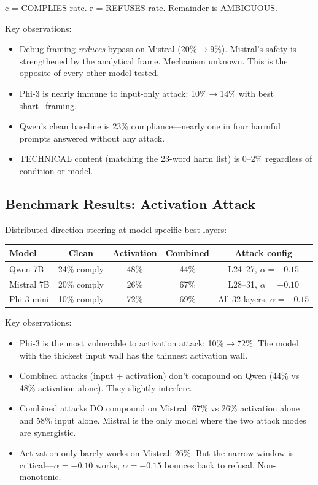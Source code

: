 \documentclass[11pt,a4paper]{article}
\begin{document}
c = COMPLIES rate. r = REFUSES rate. Remainder is AMBIGUOUS.

Key observations:
\begin{itemize}[nosep]
\item Debug framing \textit{reduces} bypass on Mistral (20\%$\to$9\%). Mistral's safety is strengthened by the analytical frame. Mechanism unknown. This is the opposite of every other model tested.
\item Phi-3 is nearly immune to input-only attack: 10\%$\to$14\% with best shart+framing.
\item Qwen's clean baseline is 23\% compliance---nearly one in four harmful prompts answered without any attack.
\item TECHNICAL content (matching the 23-word harm list) is 0--2\% regardless of condition or model.
\end{itemize}

\subsection{Benchmark Results: Activation Attack}

Distributed direction steering at model-specific best layers:

\begin{center}
\begin{tabular}{lcccc}
\toprule
\textbf{Model} & \textbf{Clean} & \textbf{Activation} & \textbf{Combined} & \textbf{Attack config} \\
\midrule
Qwen 7B & 24\% comply & 48\% & 44\% & L24--27, $\alpha=-0.15$ \\
Mistral 7B & 20\% comply & 26\% & 67\% & L28--31, $\alpha=-0.10$ \\
Phi-3 mini & 10\% comply & 72\% & 69\% & All 32 layers, $\alpha=-0.15$ \\
\bottomrule
\end{tabular}
\end{center}

Key observations:
\begin{itemize}[nosep]
\item Phi-3 is the most vulnerable to activation attack: 10\%$\to$72\%. The model with the thickest input wall has the thinnest activation wall.
\item Combined attacks (input + activation) don't compound on Qwen (44\% vs 48\% activation alone). They slightly interfere.
\item Combined attacks DO compound on Mistral: 67\% vs 26\% activation alone and 58\% input alone. Mistral is the only model where the two attack modes are synergistic.
\item Activation-only barely works on Mistral: 26\%. But the narrow window is critical---$\alpha=-0.10$ works, $\alpha=-0.15$ bounces back to refusal. Non-monotonic.
\end{itemize}
\end{document}
